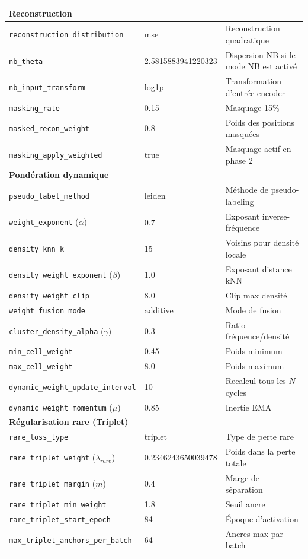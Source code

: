 \documentclass[11pt,a4paper]{article}
\begin{document}
\begin{longtable}{p{4.8cm}p{2.2cm}p{7cm}}
\midrule
\multicolumn{3}{l}{\cellcolor{nbblue!8}\textbf{Reconstruction}} \\
\midrule
\texttt{reconstruction\_distribution} & mse & Reconstruction quadratique \\
\texttt{nb\_theta} & 2.5815883941220323 & Dispersion NB si le mode NB est activ\'e \\
\texttt{nb\_input\_transform} & log1p & Transformation d'entr\'ee encoder \\
\texttt{masking\_rate} & 0.15 & Masquage 15\% \\
\texttt{masked\_recon\_weight} & 0.8 & Poids des positions masqu\'ees \\
\texttt{masking\_apply\_weighted} & true & Masquage actif en phase 2 \\

\midrule
\multicolumn{3}{l}{\cellcolor{weightpurple!8}\textbf{Pond\'eration dynamique}} \\
\midrule
\texttt{pseudo\_label\_method} & leiden & M\'ethode de pseudo-labeling \\
\texttt{weight\_exponent} ($\alpha$) & 0.7 & Exposant inverse-fr\'equence \\
\texttt{density\_knn\_k} & 15 & Voisins pour densit\'e locale \\
\texttt{density\_weight\_exponent} ($\beta$) & 1.0 & Exposant distance kNN \\
\texttt{density\_weight\_clip} & 8.0 & Clip max densit\'e \\
\texttt{weight\_fusion\_mode} & additive & Mode de fusion \\
\texttt{cluster\_density\_alpha} ($\gamma$) & 0.3 & Ratio fr\'equence/densit\'e \\
\texttt{min\_cell\_weight} & 0.45 & Poids minimum \\
\texttt{max\_cell\_weight} & 8.0 & Poids maximum \\
\texttt{dynamic\_weight\_update\_interval} & 10 & Recalcul tous les $N$ cycles \\
\texttt{dynamic\_weight\_momentum} ($\mu$) & 0.85 & Inertie EMA \\

\midrule
\multicolumn{3}{l}{\cellcolor{tripletyellow!12}\textbf{R\'egularisation rare (Triplet)}} \\
\midrule
\texttt{rare\_loss\_type} & triplet & Type de perte rare \\
\texttt{rare\_triplet\_weight} ($\lambda_{rare}$) & 0.2346243650039478 & Poids dans la perte totale \\
\texttt{rare\_triplet\_margin} ($m$) & 0.4 & Marge de s\'eparation \\
\texttt{rare\_triplet\_min\_weight} & 1.8 & Seuil ancre \\
\texttt{rare\_triplet\_start\_epoch} & 84 & \'Epoque d'activation \\
\texttt{max\_triplet\_anchors\_per\_batch} & 64 & Ancres max par batch \\


\end{longtable}
\end{document}
